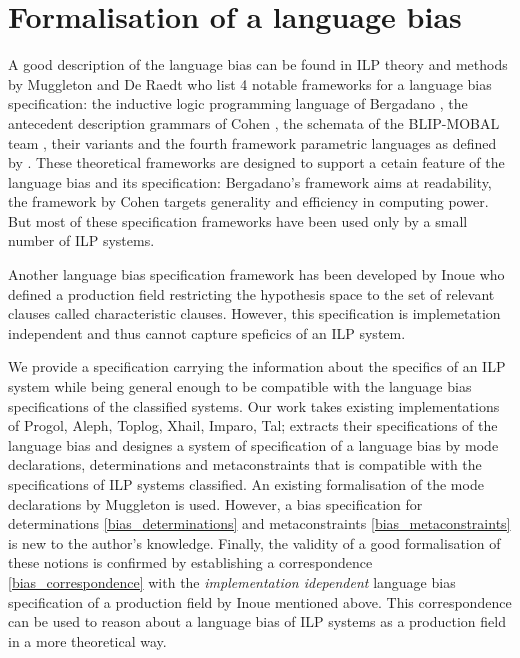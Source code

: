 \section{Formalisation of a language bias}
A good description of the language bias can be found in ILP theory and methods by Muggleton and De Raedt \cite{muggleton1994inductive} who list 4 notable frameworks for a language bias specification: the inductive logic programming language of
Bergadano \cite{bergadano1993interactive}, the antecedent description grammars of Cohen \cite{cohen1994grammatically}\cite{cohen1992compiling}, the schemata of
the BLIP-MOBAL team \cite{emde1983discovery}\cite{kietz1992controlling}, their variants \cite{de1992interactive}\cite{silverstein1991relational}
\cite{tausend1994representing} and the fourth framework parametric languages as defined by \cite{muggleton1992efficient}\cite{de1992interactive}
\cite{buntine1987induction}\cite{cohen1993learnability}.
These theoretical frameworks are designed to support a cetain feature of the language bias and its specification: Bergadano's framework aims at readability, the framework by Cohen targets generality and efficiency in computing power.
But most of these specification frameworks have been used only by a small number of ILP systems.

Another language bias specification framework has been developed by Inoue \cite{inoue1992linear} who defined a production field restricting the hypothesis space to the set of relevant clauses called characteristic clauses. However, this specification is implemetation independent and thus cannot capture speficics of an ILP system.

We provide a specification carrying the information about the specifics of an ILP system while being general enough to be compatible with the language bias specifications of the classified systems.
Our work takes existing implementations of Progol, Aleph, Toplog, Xhail, Imparo, Tal; extracts their specifications of the language bias and designes a system of specification of a language bias by mode declarations, determinations and metaconstraints that is compatible with the specifications of ILP systems classified. An existing formalisation of the mode declarations by Muggleton \cite{muggleton1995inverse} is used. However, a bias specification for determinations \ref{bias_determinations} and metaconstraints \ref{bias_metaconstraints} is new to the author's knowledge. Finally, the validity of a good formalisation of these notions is confirmed by establishing a correspondence \ref{bias_correspondence} with the \emph{implementation idependent} language bias specification of a production field by Inoue \cite{inoue1992linear} mentioned above. This correspondence can be used to reason about a language bias of ILP systems as a production field in a more theoretical way.

